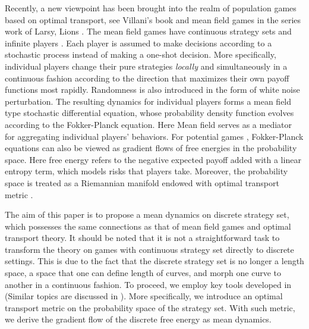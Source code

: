 \documentclass[11pt,reqno]{amsart}
\begin{document}
Recently, a new viewpoint has been brought into the realm of population games based on optimal transport, see Villani's book \cite{am2006,vil2008} and mean field games in the series work of Larsy, Lions \cite{MFG,de2014,lasry2007}. The mean field games have continuous strategy sets and infinite players \cite{bt2012, blanchet2014nash}. Each player is assumed to make decisions according to a stochastic process instead of making a one-shot decision. More specifically, individual players change their pure strategies \textit{locally} and
simultaneously in a continuous fashion according to the direction that maximizes their own payoff functions
most rapidly. Randomness is also introduced in the form of white noise perturbation. The resulting dynamics for individual players forms a mean field type stochastic differential equation, whose probability density function evolves according to the Fokker-Planck equation. Here Mean field serves as a mediator for aggregating individual players' behaviors. For potential games \cite{de2014}, Fokker-Planck equations can also be viewed as gradient flows of free energies in the probability space. Here free energy refers to the negative expected payoff added with a linear entropy term, which models risks that players take. Moreover, the probability space is treated as a Riemannian manifold endowed with optimal transport metric \cite{am2006, vil2003, vil2008}.

The aim of this paper is to propose a mean dynamics 
on discrete strategy set, which possesses the same connections as that of mean field games and optimal transport theory. It should be noted that it is not a straightforward task to transform the theory on games with continuous strategy set directly to discrete settings. This is due to the fact that the discrete strategy set is no longer a length space, a space that one can define length of curves, and morph one curve to another in a continuous fashion.
To proceed, we employ key tools developed in \cite{li-theory, li-finite, li-thesis} (Similar topics are discussed in \cite{chow2012, erbar2012ricci, maas2011gradient}).
More specifically, we introduce an optimal transport metric on the probability space of the strategy set. With such metric, we derive the gradient flow of the discrete free energy as mean dynamics.
\end{document}
